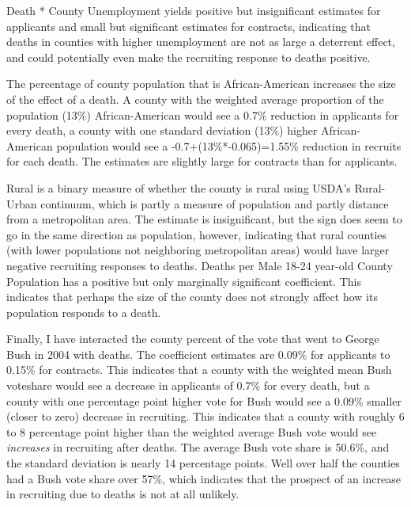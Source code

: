 \documentclass[12pt] {article}
\begin{document}
Death {*} County Unemployment yields positive but insignificant estimates
for applicants and small but significant estimates for contracts,
indicating that deaths in counties with higher unemployment are not
as large a deterrent effect, and could potentially even make the recruiting response
to deaths positive. %

The percentage of county population that is African-American increases
the size of the effect of a death. A county with the weighted average
proportion of the population (13\%) African-American would see a 0.7\%
reduction in applicants for every death, a county with one standard deviation
(13\%) higher African-American population would see a -0.7+(13\%{*}-0.065)=1.55\%
reduction in recruits for each death. The estimates are slightly large for contracts than for applicants. %

Rural is a binary measure of whether the county is rural using USDA's Rural-Urban continuum, which is partly a measure of population and partly distance from a metropolitan area. The estimate is insignificant, but the sign does seem to go in the same direction as population, however, indicating that rural counties
(with lower populations not neighboring metropolitan areas) would have larger negative recruiting responses to deaths. Deaths per Male 18-24 year-old County Population has a positive but only marginally significant coefficient. This indicates that perhaps the size of the county does not strongly affect how its population responds to a death. %

Finally, I have interacted the county percent of the vote that went
to George Bush in 2004 with deaths. The coefficient estimates are 0.09\% for applicants to 0.15\% for contracts. This indicates that a county with the weighted mean Bush voteshare would see a decrease in applicants of 0.7\% for every death, but a county with one percentage point higher vote for Bush would see a 0.09\% smaller (closer
to zero) decrease in recruiting. This indicates that a county with
roughly 6 to 8 percentage point higher than the weighted average Bush
vote would see \textit{increases} in recruiting after deaths. The average Bush
vote share is 50.6\%, and the standard deviation is nearly 14 percentage
points. Well over half the counties had a Bush vote share over 57\%, which indicates that the prospect of an increase in recruiting due to deaths is not at all unlikely.
\end{document}

